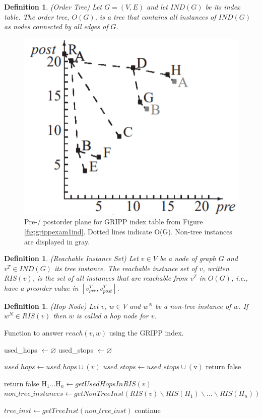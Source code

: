 \documentclass[11pt]{article}
\newtheorem{definition}[theorem]{Definition}
\begin{document}
\begin{enumerate}
	\begin{definition}{(Order Tree)}
		Let $G=(V,E)$ and let $IND(G)$ be its index table. The order tree, $O(G)$, is a tree that contains all instances of $IND(G)$ as nodes connected by
		all edges of $G$.
	\end{definition}
	\begin{figure}[H]
		\centering
		\includegraphics[width=0.3\linewidth]{"order tree"}
		\caption{Pre-/ postorder plane for GRIPP index table from Figure \ref{fig:grippexam1ind}. Dotted lines indicate O(G). Non-tree instances are displayed in gray.}
		\label{fig:order-tree}
	\end{figure}
	\begin{definition}{(Reachable Instance Set)}
		Let $v\in V $ be a node of graph $G$ and $v^T \in IND(G)$ its tree instance. The reachable instance set of $v$, written $RIS(v)$, is the set of all instances that are reachable from $v^T$ in $O(G)$, i.e., have a preorder value in $[v_{pre}^T, v_{post}^T]$.
	\end{definition}
	\begin{definition}{(Hop Node)}
		Let $v$, $w\in V$ and $w^N$ be a non-tree instance of $w$. If $w^N \in RIS(v)$ then $w$ is called a hop node for $v$.
	\end{definition}
	\begin{algorithm}[H]
		\caption{ Function to answer $reach(v, w)$ using the GRIPP index.}  
		\label{alg:gripp}
		used\_hops $\leftarrow \varnothing$\;
		used\_stops $\leftarrow \varnothing$\;
		
		{
			$used\_hops\leftarrow used\_hops\cup (v)$\;
			{
				$used\_stops \leftarrow used\_stops\cup(\mathrm{v})$\;
				return false\;
			}
			{
				{
					return false\;
				}
				$\mathrm{H}_{1}\ldots\mathrm{H}_{n}\leftarrow getUsedHopsInRIS(v)$\;
				$non\_tree\_instances\leftarrow getNonTreeInst(RIS(v)\backslash RIS(H_1) \backslash ... \backslash RIS(H_n))$\;
				{
					$tree\_inst\leftarrow getTreeInst(non\_tree\_inst)$\;
					 {continue\;}
					
}}}
\end{algorithm}
\end{enumerate}
\end{document}

